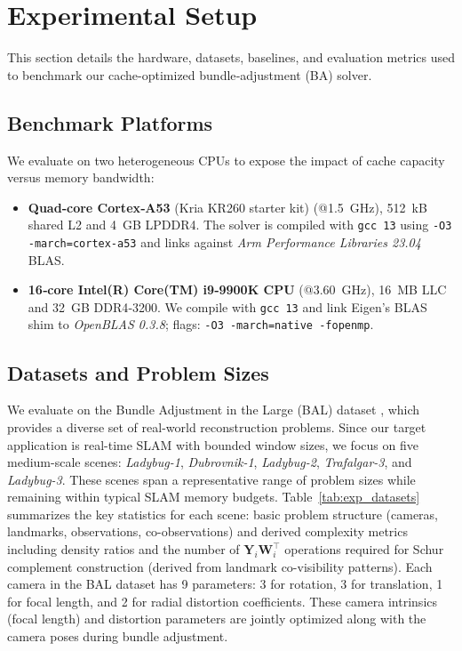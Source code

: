 \section{Experimental Setup}
\label{sec:experiments}

This section details the hardware, datasets, baselines, and evaluation metrics used to benchmark our cache-optimized bundle‑adjustment (BA) solver.

\subsection{Benchmark Platforms}
\label{subsec:exp_platforms}
We evaluate on two heterogeneous CPUs to expose the impact of cache capacity versus memory bandwidth:
\begin{itemize}
\item \textbf{Quad‑core Cortex‑A53} (Kria KR260 starter kit) (@\SI{1.5}{GHz}), \SI{512}{kB} 
shared L2 and \SI{4}{GB} LPDDR4. The solver is compiled with \texttt{gcc 13} using 
\texttt{-O3 -march=cortex-a53} and links against \emph{Arm Performance Libraries 23.04} BLAS.
\item \textbf{16‑core Intel(R) Core(TM) i9‑9900K CPU} (@\SI{3.60}{GHz}), \SI{16}{MB} LLC and
\SI{32}{GB} DDR4‑3200. We compile with \texttt{gcc 13} and link Eigen's BLAS shim to 
\emph{OpenBLAS 0.3.8}; flags: \texttt{-O3 -march=native -fopenmp}.
\end{itemize}

\subsection{Datasets and Problem Sizes}
\label{subsec:exp_datasets}
We evaluate on the Bundle Adjustment in the Large (BAL) dataset \cite{agarwal2010bundle}, which provides a
diverse set of real-world reconstruction problems. Since our target application is real-time SLAM with bounded
window sizes, we focus on five medium-scale scenes: \textit{Ladybug-1}, \textit{Dubrovnik-1}, 
\textit{Ladybug-2}, \textit{Trafalgar-3}, and \textit{Ladybug-3}. These scenes span a representative range of 
problem sizes while remaining within typical SLAM memory budgets. Table~\ref{tab:exp_datasets} summarizes the 
key statistics for each scene: basic problem structure (cameras, landmarks, observations, co-observations) and 
derived complexity metrics including density ratios and the number of $\mathbf Y_i\mathbf W_i^{\top}$ operations 
required for Schur complement construction (derived from landmark co-visibility patterns).
Each camera in the BAL dataset has 9 parameters: 3 for rotation, 3 for translation, 
1 for focal length, and 2 for radial distortion coefficients. 
These camera intrinsics (focal length) and distortion parameters are 
jointly optimized along with the camera poses during bundle adjustment.

